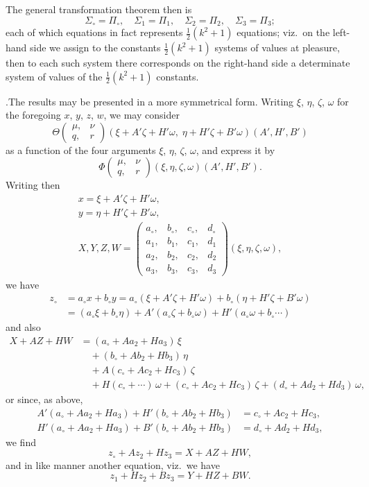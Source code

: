 \documentclass[11pt]{article}
\begin{document}
The general transformation theorem then is
\[
\Sigma_{\circ} = \Pi_{\circ},\quad \Sigma_1 = \Pi_1,\quad \Sigma_2 = \Pi_2,\quad \Sigma_3 = \Pi_3;
\]
each of which equations in fact represents $\tfrac{1}{2}(k^2+1)$ equations; viz.\ on the left-hand side we assign to the constants $\tfrac{1}{2}(k^2+1)$ systems of values at pleasure, then to each such system there corresponds on the right-hand side a determinate system of values of the $\tfrac{1}{2}(k^2+1)$ constants.

\medskip

.\quad The results may be presented in a more symmetrical form. Writing $\xi$, $\eta$, $\zeta$, $\omega$ for the foregoing $x$, $y$, $z$, $w$, we may consider
\[
\Theta\!\begin{pmatrix} \mu, & \nu \\ q, & r \end{pmatrix}\!(\xi+A'\zeta+H'\omega,\; \eta+H'\zeta+B'\omega)(A',H',B')
\]
as a function of the four arguments $\xi$, $\eta$, $\zeta$, $\omega$, and express it by
\[
\Phi\!\begin{pmatrix} \mu, & \nu \\ q, & r \end{pmatrix}\!(\xi,\eta,\zeta,\omega)(A',H',B').
\]
Writing then
\begin{gather*}
x = \xi+A'\zeta+H'\omega,\\
y = \eta+H'\zeta+B'\omega,\\
X,Y,Z,W = \begin{pmatrix} a_{\circ}, & b_{\circ}, & c_{\circ}, & d_{\circ} \\ a_1, & b_1, & c_1, & d_1 \\ a_2, & b_2, & c_2, & d_2 \\ a_3, & b_3, & c_3, & d_3 \end{pmatrix}\!(\xi,\eta,\zeta,\omega),
\end{gather*}
we have
\begin{align*}
z_{\circ} &= a_{\circ}x+b_{\circ}y = a_{\circ}(\xi+A'\zeta+H'\omega)+b_{\circ}(\eta+H'\zeta+B'\omega)\\
&= (a_{\circ}\xi+b_{\circ}\eta)+A'(a_{\circ}\zeta+b_{\circ}\omega)+H'(a_{\circ}\omega+b_{\circ}\dotsb)
\end{align*}
and also
\begin{align*}
X+AZ+HW &= (a_{\circ}+Aa_2+Ha_3)\,\xi\\
&\quad + (b_{\circ}+Ab_2+Hb_3)\,\eta\\
&\quad + A(c_{\circ}+Ac_2+Hc_3)\,\zeta\\
&\quad + H(c_{\circ}+\dotsb)\,\omega + (c_{\circ}+Ac_2+Hc_3)\,\zeta + (d_{\circ}+Ad_2+Hd_3)\,\omega,
\end{align*}
or since, as above,
\begin{align*}
A'(a_{\circ}+Aa_2+Ha_3) + H'(b_{\circ}+Ab_2+Hb_3) &= c_{\circ}+Ac_2+Hc_3,\\
H'(a_{\circ}+Aa_2+Ha_3) + B'(b_{\circ}+Ab_2+Hb_3) &= d_{\circ}+Ad_2+Hd_3,
\end{align*}
we find
\[
z_{\circ}+Az_2+Hz_3 = X+AZ+HW,
\]
and in like manner another equation, viz.\ we have
\[
z_1+Hz_2+Bz_3 = Y+HZ+BW.
\]
\end{document}
